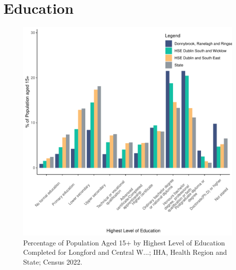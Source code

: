 \documentclass{article}
\begin{document}
\section{Education}\label{sect:Edu}
\begin{figure}[H]
	\centering
	\includegraphics[width = 120mm]{../figures/EduED.pdf}
	\caption{Percentage of Population Aged 15+ by Highest Level of Education Completed for Longford and Central W...; IHA, Health Region and State; Census 2022.}
	\label{fig:vbnv}
	\end{figure}
\end{document}
